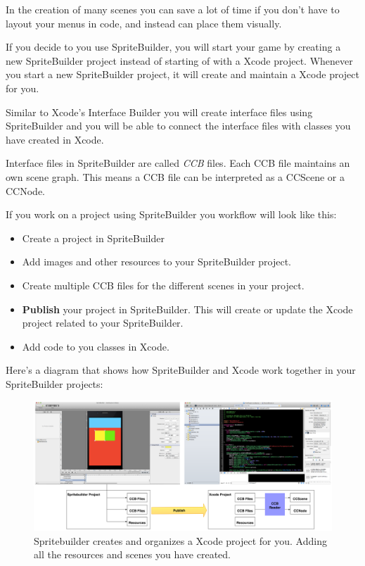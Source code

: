 \documentclass{scrreprt}
\newcommand{\spriteb}{SpriteBuilder}
\begin{document}
In the creation of many scenes you can save a lot of time if you don't
have to layout your menus in code, and instead can place them visually.

If you decide to you use \spriteb{}, you will start your game by creating a new
\spriteb{} project instead of starting of with a Xcode project. Whenever you
start a new \spriteb{} project, it will create and maintain a Xcode project for
you.

Similar to Xcode's Interface Builder you will create interface files using
\spriteb{} and you will be able to connect the interface files with classes you
have created in Xcode.

Interface files in \spriteb{} are called \textit{CCB} files. Each 
CCB file maintains an own scene graph. This means a CCB file can be interpreted
as a CCScene or a CCNode.

If you work on a project using \spriteb{} you workflow will look like this:
\begin{itemize}
  \item Create a project in \spriteb{}
  \item Add images and other resources to your \spriteb{} project.
  \item Create multiple CCB files for the different scenes in your project.
  \item \textbf{Publish} your project in \spriteb{}. This will create or update
  the Xcode project related to your \spriteb{}. 
  \item Add code to you classes in Xcode.
\end{itemize}

Here's a diagram that shows how \spriteb{} and Xcode work together in your
\spriteb{} projects:

\begin{figure}[H]
		\centering
		\includegraphics[width=400pt]{images/spritebuilder_publishing.png}     
		\caption{Spritebuilder creates and organizes a Xcode project for you. Adding
		all the resources and scenes you have created.}
\end{figure}
\end{document}
